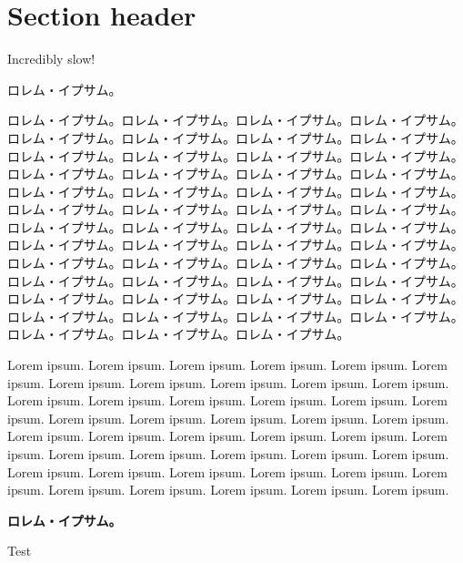 \documentclass{ltjarticle}
\begin{document}
\tableofcontents

\section{Section header}

Incredibly slow!

ロレム・イプサム。

ロレム・イプサム。ロレム・イプサム。ロレム・イプサム。ロレム・イプサム。ロレム・イプサム。ロレム・イプサム。ロレム・イプサム。ロレム・イプサム。ロレム・イプサム。ロレム・イプサム。ロレム・イプサム。ロレム・イプサム。ロレム・イプサム。ロレム・イプサム。ロレム・イプサム。ロレム・イプサム。ロレム・イプサム。ロレム・イプサム。ロレム・イプサム。ロレム・イプサム。ロレム・イプサム。ロレム・イプサム。ロレム・イプサム。ロレム・イプサム。ロレム・イプサム。ロレム・イプサム。ロレム・イプサム。ロレム・イプサム。ロレム・イプサム。ロレム・イプサム。ロレム・イプサム。ロレム・イプサム。ロレム・イプサム。ロレム・イプサム。ロレム・イプサム。ロレム・イプサム。ロレム・イプサム。ロレム・イプサム。ロレム・イプサム。ロレム・イプサム。ロレム・イプサム。ロレム・イプサム。ロレム・イプサム。ロレム・イプサム。ロレム・イプサム。ロレム・イプサム。ロレム・イプサム。ロレム・イプサム。ロレム・イプサム。ロレム・イプサム。ロレム・イプサム。

Lorem ipsum. Lorem ipsum. Lorem ipsum. Lorem ipsum. Lorem ipsum. Lorem ipsum. Lorem ipsum. Lorem ipsum. Lorem ipsum. Lorem ipsum. Lorem ipsum. Lorem ipsum. Lorem ipsum. Lorem ipsum. Lorem ipsum. Lorem ipsum. Lorem ipsum. Lorem ipsum. Lorem ipsum. Lorem ipsum. Lorem ipsum. Lorem ipsum. Lorem ipsum. Lorem ipsum. Lorem ipsum. Lorem ipsum. Lorem ipsum. Lorem ipsum. Lorem ipsum. Lorem ipsum. Lorem ipsum. Lorem ipsum. Lorem ipsum. Lorem ipsum. Lorem ipsum. Lorem ipsum. Lorem ipsum. Lorem ipsum. Lorem ipsum. Lorem ipsum. Lorem ipsum. Lorem ipsum. Lorem ipsum. Lorem ipsum.

\textbf{ロレム・イプサム。}

Test
\end{document}
